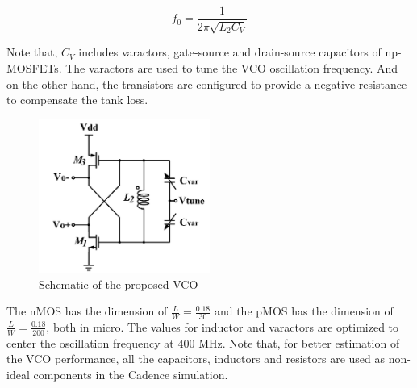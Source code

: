 \begin{equation}
f_0 = \frac{1}{2\pi\sqrt{L_2C_V}}
\end{equation}

Note that, $C_V$ includes varactors, gate-source and drain-source capacitors of np-MOSFETs. The varactors are used to tune the VCO oscillation frequency. And on the other hand, the transistors are configured to provide a negative resistance to compensate the tank loss. 

\begin{figure}[h]
   \centering
    \includegraphics[width=0.50\textwidth]{figures/VCO.png}
    \caption{Schematic of the proposed VCO}
    \label{fig:vco}
\end{figure}


The nMOS has the dimension of $\frac{L}{W}=\frac{0.18}{30}$ and the pMOS has the dimension of $\frac{L}{W}=\frac{0.18}{200}$, both in micro. The values for inductor and varactors are optimized to center the oscillation frequency at 400 MHz. Note that, for better estimation of the VCO performance, all the capacitors, inductors and resistors are used as non-ideal components in the Cadence simulation. 

